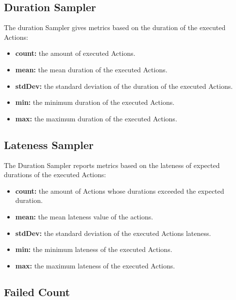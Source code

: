 \subsection{Duration Sampler}
The duration Sampler gives metrics based on the duration of the executed Actions:
\begin{itemize}
	\item \textbf{count:} the amount of executed Actions.
	\item \textbf{mean:} the mean duration of the executed Actions.
	\item \textbf{stdDev:} the standard deviation of the duration of the executed Actions.
	\item \textbf{min:} the minimum duration of the executed Actions.
	\item \textbf{max:} the maximum duration of the executed Actions.
\end{itemize}
\subsection{Lateness Sampler}
The Duration Sampler reports metrics based on the lateness of expected durations of the executed Actions:
\begin{itemize}
	\item \textbf{count:} the amount of Actions whose durations exceeded the expected duration.
	\item \textbf{mean:} the mean lateness value of the actions.
	\item \textbf{stdDev:} the standard deviation of the executed Actions lateness.
	\item \textbf{min:} the minimum lateness of the executed Actions.
	\item \textbf{max:} the maximum lateness of the executed Actions.
\end{itemize}

\subsection{Failed Count}

